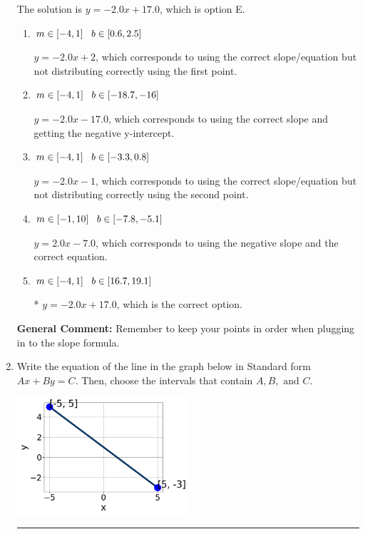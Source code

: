 \documentclass{extbook}[14pt]
\newcommand{\litem}[1]{\item #1

\rule{\textwidth}{0.4pt}}
\begin{document}
\begin{enumerate}
{The solution is \( y = -2.0x + 17.0 \), which is option E.\begin{enumerate}[label=\Alph*.]
\item \( m \in [-4, 1] \hspace*{3mm} b \in [0.6, 2.5] \)

 $y = -2.0x + 2$, which corresponds to using the correct slope/equation but not distributing correctly using the first point.
\item \( m \in [-4, 1] \hspace*{3mm} b \in [-18.7, -16] \)

 $y = -2.0x -17.0$, which corresponds to using the correct slope and getting the negative y-intercept.
\item \( m \in [-4, 1] \hspace*{3mm} b \in [-3.3, 0.8] \)

 $y = -2.0x -1$, which corresponds to using the correct slope/equation but not distributing correctly using the second point.
\item \( m \in [-1, 10] \hspace*{3mm} b \in [-7.8, -5.1] \)

 $y = 2.0x -7.0$, which corresponds to using the negative slope and the correct equation.
\item \( m \in [-4, 1] \hspace*{3mm} b \in [16.7, 19.1] \)

* $y = -2.0x + 17.0$, which is the correct option.
\end{enumerate}

\textbf{General Comment:} Remember to keep your points in order when plugging in to the slope formula.
}
\litem{
Write the equation of the line in the graph below in Standard form $Ax+By=C$. Then, choose the intervals that contain $A, B, \text{ and } C$.

\begin{center}
    \includegraphics[width=0.5\textwidth]{../Figures/linearGraphToStandardCopyB.png}
\end{center}




}
\end{enumerate}
\end{document}
